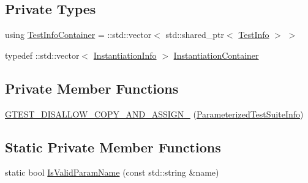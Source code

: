 \subsection*{Private Types}
\begin{DoxyCompactItemize}
\item 
using \hyperlink{classtesting_1_1internal_1_1ParameterizedTestSuiteInfo_a0578de1b5b1852655771349b785d7fb7}{Test\+Info\+Container} = \+::std\+::vector$<$ std\+::shared\+\_\+ptr$<$ \hyperlink{structtesting_1_1internal_1_1ParameterizedTestSuiteInfo_1_1TestInfo}{Test\+Info} $>$ $>$
\item 
typedef \+::std\+::vector$<$ \hyperlink{structtesting_1_1internal_1_1ParameterizedTestSuiteInfo_1_1InstantiationInfo}{Instantiation\+Info} $>$ \hyperlink{classtesting_1_1internal_1_1ParameterizedTestSuiteInfo_a65cee35a4b9653272b6017640816eb68}{Instantiation\+Container}
\end{DoxyCompactItemize}
\subsection*{Private Member Functions}
\begin{DoxyCompactItemize}
\item 
\hyperlink{classtesting_1_1internal_1_1ParameterizedTestSuiteInfo_a2370bc6f72b85b499fa05c375358df9e}{G\+T\+E\+S\+T\+\_\+\+D\+I\+S\+A\+L\+L\+O\+W\+\_\+\+C\+O\+P\+Y\+\_\+\+A\+N\+D\+\_\+\+A\+S\+S\+I\+G\+N\+\_\+} (\hyperlink{classtesting_1_1internal_1_1ParameterizedTestSuiteInfo}{Parameterized\+Test\+Suite\+Info})
\end{DoxyCompactItemize}
\subsection*{Static Private Member Functions}
\begin{DoxyCompactItemize}
\item 
static bool \hyperlink{classtesting_1_1internal_1_1ParameterizedTestSuiteInfo_a978b6780b449fc1ad63dec758e899679}{Is\+Valid\+Param\+Name} (const std\+::string \&name)
\end{DoxyCompactItemize}
